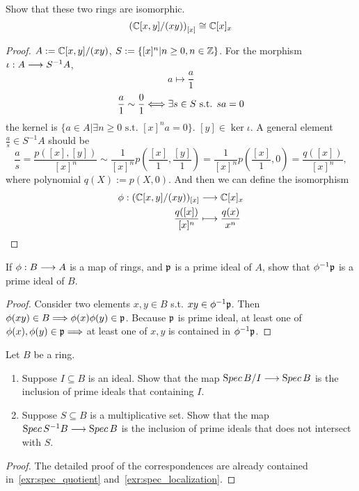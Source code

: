 \documentclass[11pt,fleqn]{book}
\begin{document}
\begin{exr}
Show that these two rings are isomorphic. 
$$
\left(\mathbb C[x,y]/(xy)\right)_{[x]}\cong \mathbb C[x]_x
$$
\end{exr}
\begin{proof}
$A:=\mathbb C[x,y]/(xy)$, $S:=\{[x]^n|n\geq 0,n\in\mathbb Z\}$. For the morphism $\iota:A\longrightarrow S^{-1}A$,
$$
a\longmapsto \frac{a}{1}
$$
$$
\frac{a}{1}\sim \frac{0}{1}\Longleftrightarrow \exists s\in S \text{ s.t. } sa=0
$$
 the kernel is $\{a\in A|\exists n\geq 0 \text{ s.t. } [x]^na=0\}$. $[y]\in \ker \iota$. A general element $\frac{a}{s}\in S^{-1}A$ should be 
 $$
\frac{a}{s}=\frac{p([x],[y])}{[x]^n}\sim \frac{1}{[x]^n}p\left(\frac{[x]}{1},\frac{[y]}{1}\right)=\frac{1}{[x]^n}p\left(\frac{[x]}{1},0\right)=\frac{q([x])}{[x]^n},
 $$
 where polynomial $q(X):=p(X,0)$.
And then we can define the isomorphism 
$$
\begin{aligned}
\phi: (\mathbb C[x,y]/(xy))_{[x]}&\longrightarrow \mathbb C[x]_x\\
 \frac{q([x])}{[x]^n}&\longmapsto \frac{q(x)}{x^n}
\end{aligned}
$$
\end{proof}

\begin{exr}
If $\phi: B\longrightarrow A$ is a map of rings, and ${\mathfrak p}$ is a prime ideal of $A$, show that $\phi^{-1}{\mathfrak p}$ is a prime ideal of $B$.
\end{exr}
\begin{proof}
Consider two elements $x,y\in B$ s.t. $xy\in \phi^{-1}{\mathfrak p}$. Then $\phi(xy)\in B\Longrightarrow \phi(x)\phi(y)\in{\mathfrak p}$. Because ${\mathfrak p}$ is prime ideal, at least one of $\phi(x),\phi(y)\in{\mathfrak p}\Longrightarrow $ at least one of $x,y$ is contained in $\phi^{-1}{\mathfrak p}$.
\end{proof}

\begin{exr}
Let $B$ be a ring.
\begin{enumerate}[label=(\alph*)]
	\item  Suppose $I\subseteq B$ is an ideal. Show that the map ${\text Spec\,} B/I\longrightarrow {\text Spec\,} B$ is the inclusion of  prime ideals that containing $I$.
    \item  Suppose $S\subseteq B$ is a multiplicative set. Show that the map ${\text Spec\,} S^{-1}B\longrightarrow {\text Spec\,} B$ is the inclusion of prime ideals that does not intersect with $S$.
\end{enumerate}
\end{exr}
\begin{proof}
The detailed proof of the correspondences are already contained in~\ref{exr:spec_quotient} and~\ref{exr:spec_localization}.
\end{proof}
\end{document}
